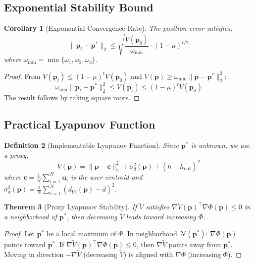 \documentclass[11pt,a4paper]{article}
\newtheorem{theorem}{Theorem}[section]
\newtheorem{corollary}[theorem]{Corollary}
\newtheorem{definition}[theorem]{Definition}
\newcommand{\calN}{\mathcal{N}}
\newcommand{\bp}{\mathbf{p}}
\newcommand{\bu}{\mathbf{u}}
\newcommand{\bc}{\mathbf{c}}
\newcommand{\popt}{\mathbf{p}^*}
\begin{document}
\subsection{Exponential Stability Bound}

\begin{corollary}[Exponential Convergence Rate]
The position error satisfies:
\begin{equation}
    \|\bp_t - \popt\|_2 \leq \sqrt{\frac{V(\bp_0)}{\omega_{\min}}} \cdot (1-\mu)^{t/2}
\end{equation}
where $\omega_{\min} = \min\{\omega_1, \omega_2, \omega_3\}$.
\end{corollary}

\begin{proof}
From $V(\bp_t) \leq (1-\mu)^t V(\bp_0)$ and $V(\bp) \geq \omega_{\min}\|\bp - \popt\|_2^2$:
\begin{equation}
    \omega_{\min}\|\bp_t - \popt\|_2^2 \leq V(\bp_t) \leq (1-\mu)^t V(\bp_0)
\end{equation}
The result follows by taking square roots.
\end{proof}

\subsection{Practical Lyapunov Function}

\begin{definition}[Implementable Lyapunov Function]
Since $\popt$ is unknown, we use a proxy:
\begin{equation}
    \tilde{V}(\bp) = \|\bp - \bc\|_2^2 + \sigma^2_d(\bp) + (h - h_{\text{opt}})^2
\end{equation}
where $\bc = \frac{1}{N}\sum_{i=1}^N \bu_i$ is the user centroid and $\sigma^2_d(\bp) = \frac{1}{N}\sum_{i=1}^N (d_{Ui}(\bp) - \bar{d})^2$.
\end{definition}

\begin{theorem}[Proxy Lyapunov Stability]
If $\tilde{V}$ satisfies $\nabla\tilde{V}(\bp)^\top \nabla\Phi(\bp) \leq 0$ in a neighborhood of $\popt$, then decreasing $\tilde{V}$ leads toward increasing $\Phi$.
\end{theorem}

\begin{proof}
Let $\popt$ be a local maximum of $\Phi$. In neighborhood $\calN(\popt)$: $\nabla\Phi(\bp)$ points toward $\popt$. If $\nabla\tilde{V}(\bp)^\top \nabla\Phi(\bp) \leq 0$, then $\nabla\tilde{V}$ points away from $\popt$. Moving in direction $-\nabla\tilde{V}$ (decreasing $\tilde{V}$) is aligned with $\nabla\Phi$ (increasing $\Phi$).
\end{proof}
\end{document}
